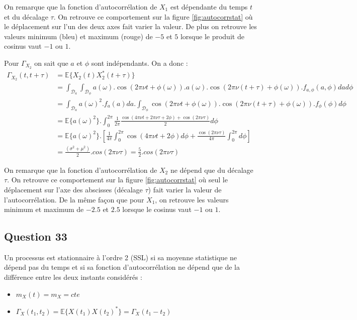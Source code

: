 \documentclass{article}
\begin{document}
\noindent
On remarque que la fonction d'autocorrélation de $X_1$ est dépendante du temps $t$ et du décalage $\tau$. On retrouve ce comportement sur la figure \ref{fig:autocorrstat} où le déplacement sur l'un des deux axes fait varier la valeur. De plus on retrouve les valeurs minimum (bleu) et maximum (rouge) de $-5$ et $5$ lorsque le produit de cosinus vaut $-1$ ou $1$.

\noindent
Pour $\Gamma_{X_2}$ on sait que  $a$ et $\phi$ sont indépendants. On a donc :
\begin{equation}
\begin{aligned}
\Gamma_{X_2}(t,t+\tau)
& = \mathbb{E}\{X_2(t)X_2^*(t+\tau)\} \\
& = \int_{\mathcal{D}_a}\int_{\mathcal{D}_\phi}a(\omega).\cos(2\pi\nu t + \phi(\omega)).a(\omega).\cos(2\pi\nu(t+\tau) + \phi(\omega)).f_{a,\phi}(a,\phi)\mathit{da}\mathit{d\phi} \\
& = \int_{\mathcal{D}_a}a(\omega)^2.f_a(a)da.\int_{\mathcal{D}_\phi}\cos(2\pi\nu t + \phi(\omega)).\cos(2\pi\nu(t+\tau) + \phi(\omega)).f_{\phi}(\phi)d\phi \\
& = \mathbb{E}\{a(\omega)^2\}.\int_0^{2\pi}\frac{1}{2\pi}\frac{\cos(4\pi\nu t + 2\pi\nu\tau + 2\phi) + \cos(2\pi\nu\tau)}{2}d\phi \\
& = \mathbb{E}\{a(\omega)^2\}.[\frac{1}{4\pi}\int_0^{2\pi}\cos(4\pi\nu t + 2\phi)d\phi + \frac{\cos(2\pi\nu\tau)}{4\pi}\int_0^{2\pi}d\phi] \\
& = \frac{(\sigma^2 +\mu^2)}{2}.cos(2\pi\nu\tau) = \frac{5}{2}.cos(2\pi\nu\tau)
\end{aligned}
\end{equation}

\noindent
On remarque que la fonction d'autocorrélation de $X_2$ ne dépend que du décalage $\tau$. On retrouve ce comportement sur la figure \ref{fig:autocorrstat} où seul le déplacement sur l'axe des abscisses (décalage $\tau$) fait varier la valeur de l'autocorrélation. De la même façon que pour $X_1$, on retrouve les valeurs minimum et maximum de $-2.5$ et $2.5$ lorsque le cosinus vaut $-1$ ou $1$.

\subsection*{Question 33}
Un processus est stationnaire à l'ordre 2 (SSL) si sa moyenne statistique ne dépend pas du temps et si sa fonction d'autocorrélation ne dépend que de la différence entre les deux instants considérés :
\begin{itemize}
\item $m_X(t) = m_X = \mathit{cte}$
\item $\Gamma_X(t_1,t_2) = \mathbb{E}\{X(t_1)X(t_2)^*\} = \Gamma_X(t_1 - t_2)$
\end{itemize}
\end{document}
